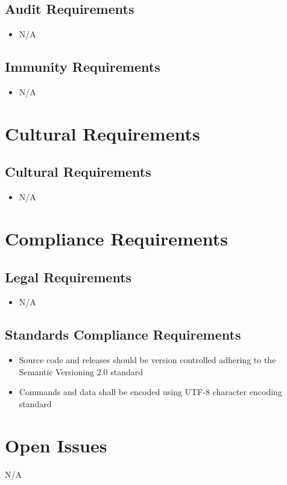 \documentclass[12pt]{article}
\begin{document}
\subsection{Audit Requirements}
\begin{itemize}
    \item N/A
\end{itemize}
\subsection{Immunity Requirements}
\begin{itemize}
    \item N/A
\end{itemize}

\section{Cultural Requirements}
\subsection{Cultural Requirements}
\begin{itemize}
    \item N/A
\end{itemize}

\section{Compliance Requirements}
\subsection{Legal Requirements}
\begin{itemize}
    \item N/A
\end{itemize}

\subsection{Standards Compliance Requirements}
\begin{itemize}
    \item Source code and releases should be version controlled adhering to the Semantic Versioning 2.0 standard
    \item Commands and data shall be encoded using UTF-8 character encoding standard
\end{itemize}

\section{Open Issues}
N/A
\end{document}

